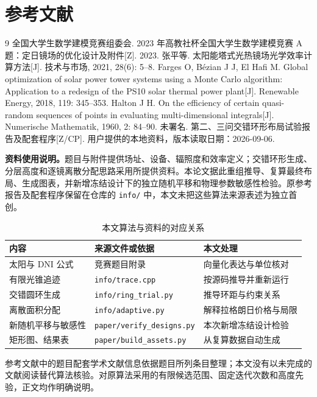 \section{参考文献}
\begingroup
\renewcommand{\section}[2]{}
\begin{thebibliography}{9}\small
{} 全国大学生数学建模竞赛组委会. 2023 年高教社杯全国大学生数学建模竞赛 A 题：定日镜场的优化设计及附件[Z]. 2023.
 张平等. 太阳能塔式光热镜场光学效率计算方法[J]. 技术与市场, 2021, 28(6): 5--8.
 Farges O, Bézian J J, El Hafi M. Global optimization of solar power tower systems using a Monte Carlo algorithm: Application to a redesign of the PS10 solar thermal power plant[J]. Renewable Energy, 2018, 119: 345--353.
 Halton J H. On the efficiency of certain quasi-random sequences of points in evaluating multi-dimensional integrals[J]. Numerische Mathematik, 1960, 2: 84--90.
 未署名. 第二、三问交错环形布局试验报告及配套程序[Z/CP]. 用户提供的本地资料，版本读取日期：2026-09-06.
\end{thebibliography}
\endgroup
\noindent\textbf{资料使用说明。}题目与附件提供场址、设备、辐照度和效率定义；交错环形生成、分层高度和逐镜离散分配思路采用所提供资料\cite{source}。本论文据此重组推导、复算最终布局、生成图表，并新增冻结设计下的独立随机平移和物理参数敏感性检验。原参考报告及配套程序保留在仓库的 \texttt{info/} 中，本文未把这些算法来源表述为独立首创。

\begin{table}[H]\centering\small
\caption{本文算法与资料的对应关系}
\begin{tabular}{p{38mm}p{66mm}p{38mm}}\toprule
内容 & 来源文件或依据 & 本文处理\\\midrule
太阳与 DNI 公式 & 竞赛题目附录 & 向量化表达与单位核对\\
有限光锥追迹 & \texttt{info/trace.cpp} & 按源码推导并重新运行\\
交错圆环生成 & \texttt{info/ring\_trial.py} & 推导环距与约束关系\\
离散面积分配 & \texttt{info/adaptive.py} & 解释拉格朗日价格与局限\\
新随机平移与敏感性 & \texttt{paper/verify\_designs.py} & 本次新增冻结设计检验\\
矩形图、结果表 & \texttt{paper/build\_assets.py} & 从复算数据自动生成\\
\bottomrule\end{tabular}\end{table}
参考文献中的题目配套学术文献信息依据题目所列条目整理；本文没有以未完成的文献阅读替代算法核验。对原算法采用的有限候选范围、固定迭代次数和高度先验，正文均作明确说明。

